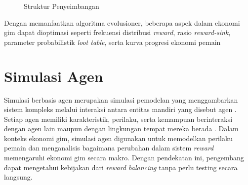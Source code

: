 \begin{figure}[htbp]
\centering
{}
\caption{Struktur Penyeimbangan \citep{Rupp_2024}}
\label{fig:balancer_structure}
\end{figure}

Dengan memanfaatkan algoritma evolusioner, beberapa aspek dalam ekonomi gim dapat dioptimasi seperti frekuensi distribusi \textit{reward}, rasio \textit{reward-sink}, parameter probabilistik \textit{loot table}, serta kurva progresi ekonomi pemain

\section{Simulasi Agen}

Simulasi berbasis agen merupakan simulasi pemodelan yang menggambarkan sistem kompleks melalui interaksi antara entitas mandiri yang disebut agen \citep{MacalNorth2005}. Setiap agen memiliki karakteristik, perilaku, serta kemampuan berinteraksi dengan agen lain maupun dengan lingkungan tempat mereka berada \citep{DatserisVahdatiDuBois2021}. Dalam konteks ekonomi gim, simulasi agen digunakan untuk memodelkan perilaku pemain dan menganalisis bagaimana perubahan dalam sistem \textit{reward} memengaruhi ekonomi gim secara makro. Dengan pendekatan ini, pengembang dapat mengetahui kebijakan dari \textit{reward balancing} tanpa perlu testing secara langsung.

